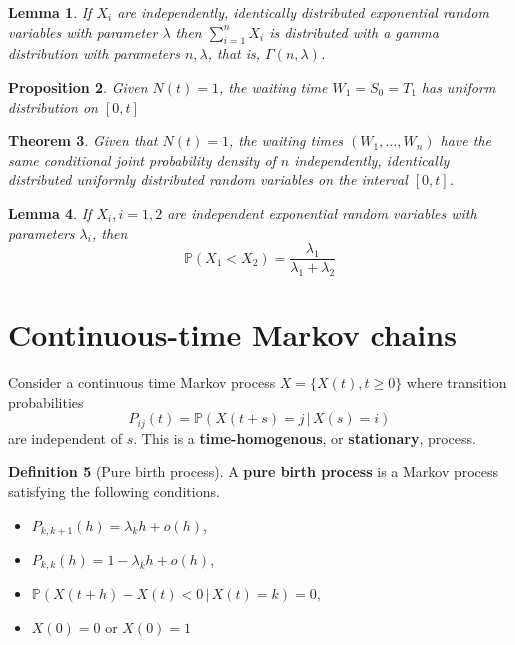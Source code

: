 \documentclass[10pt, oneside, reqno]{amsart}
\theoremstyle{plain}%
\newtheorem{thm}{Theorem}[section]
\newtheorem{lem}[thm]{Lemma}
\newtheorem{prop}[thm]{Proposition}
\theoremstyle{definition}
\newtheorem{defn}[thm]{Definition}
\theoremstyle{remark}
\newcommand{\prob}[1]{\mathbb{P}(#1)}
\newcommand{\given}{ \, | \,}
\begin{document}
\begin{lem}
	If $X_i$ are independently, identically distributed exponential random variables with parameter $\lambda$ then $\sum_{i = 1}^n X_i$ is distributed with a gamma distribution with parameters $n, \lambda$, that is, $\Gamma(n,\lambda)$.
\end{lem}

\begin{prop}
	Given $N(t) = 1$, the waiting time $W_1 = S_0 = T_1$ has uniform distribution on $[0,t]$
\end{prop}

\begin{thm}
	Given that $N(t) = 1$, the waiting times $(W_1, \dots, W_n)$ have the same conditional joint probability density of $n$ independently, identically distributed uniformly distributed random variables on the interval $[0,t]$.
\end{thm}

\begin{lem}
	If $X_i, i = 1,2$ are independent exponential random variables with parameters $\lambda_i$, then \[
		\prob{X_1 < X_2} = \frac{\lambda_1}{\lambda_1 + \lambda_2}
	\]
\end{lem}

\section{Continuous-time Markov chains} %
\label{sub:continuous_time_markov_chains}
Consider a continuous time Markov process $X = \{X(t), t \geq 0 \}$ where transition probabilities \[
	P_{ij}(t) = \prob{X(t+s) = j \given X(s) = i}
\] are independent of $s$.  This is a \textbf{time-homogenous}, or \textbf{stationary}, process.

\begin{defn}[Pure birth process]
	A \textbf{pure birth process} is a Markov process satisfying the following conditions.
	\begin{itemize}
		\item $P_{k,k+1}(h) = \lambda_k h + o(h)$,
		\item $P_{k,k}(h) = 1 - \lambda_k h + o(h)$,
		\item $\prob{X(t+h) - X(t) < 0 \given X(t) = k} = 0$,
		\item $X(0) = 0$ or $X(0) = 1$
	\end{itemize}
\end{defn}
\end{document}

